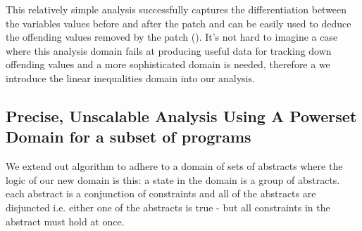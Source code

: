 
This relatively simple analysis successfully captures the differentiation between the variables values before and after the patch and can be easily used to deduce the offending values removed by the patch ().
It's not hard to imagine a case where this analysis domain fails at producing useful data for tracking down offending values and a more sophisticated domain is needed, therefore a we introduce the linear inequalities domain into our analysis.


\subsection{Precise, Unscalable Analysis Using A Powerset Domain for a subset of programs}

We extend out algorithm to adhere to a domain of sets of abstracts where the logic of our new domain is this: a state in the domain is a group of abstracts. each abstract is a conjunction of constraints and all of the abstracts are disjuncted i.e. either one of the abstracts is true - but all constraints in the abstract must hold at once.

